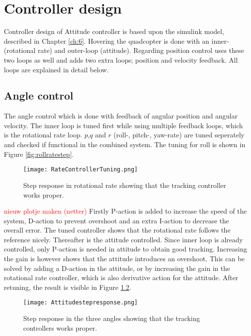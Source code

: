\chapter{Controller design}
Controller design of Attitude controller is based upon the simulink model, described in Chapter \ref{ch:6}. Hovering the quadcopter is done with an inner-(rotational rate) and outer-loop (attitude). Regarding position control uses these two loops as well and adds two extra loops; position and velocity feedback. All loops are explained in detail below.\\

\section{Angle control}
The angle control which is done with feedback of angular position and angular velocity. The inner loop is tuned first while using multiple feedback loops, which is the rotational rate loop. $p$,$q$ and $r$ (roll-, pitch-, yaw-rate) are tuned seperately and checked if functional in the combined system. The tuning for roll is shown in Figure \ref{fig:rollratestep}.

\begin{figure}[H]
\centering
\texttt{[image: RateControllerTuning.png]}
\caption{Step response in rotational rate showing that the tracking controller works proper.}
\label{fig:RateControllerTuning}
\end{figure}

\textcolor{red}{nieuw plotje maken (netter)}
Firstly P-action is added to increase the speed of the system, D-action to prevent overshoot and an extra I-action to decrease the overall error. The tuned controller shows that the rotational rate follows the reference nicely. Thereafter is the attitude controlled. Since inner loop is already controlled, only P-action is needed in attitude to obtain good tracking. Increasing the gain is however shows that the attitude introduces an overshoot. This can be solved by adding a D-action in the attitude, or by increasing the gain in the rotational rate controller, which is also derivative action for the attitude. After retuning, the result is visible in Figure \ref{fig:AttitudeControl}.

\begin{figure}[H]
\centering
\texttt{[image: Attitudestepresponse.png]}
\caption{Step response in the three angles showing that the tracking controllers works proper.}
\label{fig:AttitudeControl}
\end{figure}

